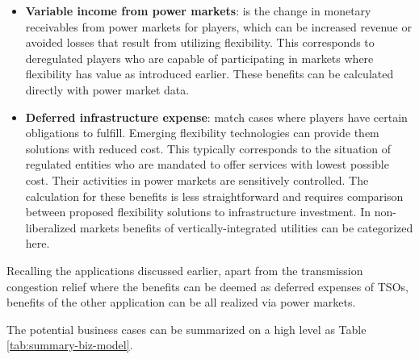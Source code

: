 \begin{itemize}
	\item \textbf{Variable income from power markets}: is the change in monetary receivables from power markets for players, which can be increased revenue or avoided losses that result from utilizing flexibility. This corresponds to deregulated players who are capable of participating in markets where flexibility has value as introduced earlier. These benefits can be calculated directly with power market data.
	\item \textbf{Deferred infrastructure expense}: match cases where players have certain obligations to fulfill. Emerging flexibility technologies can provide them solutions with reduced cost. This typically corresponds to the situation of regulated entities who are mandated to offer services with lowest possible cost. Their activities in power markets are sensitively controlled. The calculation for these benefits is less straightforward and requires comparison between proposed flexibility solutions to infrastructure investment. In non-liberalized markets benefits of vertically-integrated utilities can be categorized here.
\end{itemize}

Recalling the applications discussed earlier, apart from the transmission congestion relief where the benefits can be deemed as deferred expenses of TSOs, benefits of the other application can be all realized via power markets.

The potential business cases can be summarized on a high level as Table \ref{tab:summary-biz-model}.

